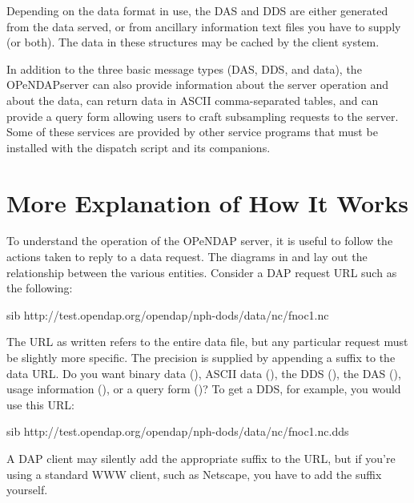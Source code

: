 \documentclass{dods-book}
\begin{document}
Depending on the data format in use, the DAS and DDS are either
generated from the data served, or from ancillary information
 text files you have to
supply (or both). The data in these structures may be cached by the
client system.

In addition to the three basic message types (DAS, DDS, and data), the
OPeNDAPserver can also provide information about the server operation
and about the data, can return data in ASCII comma-separated tables,
and can provide a query form allowing users to craft subsampling
requests to the server. Some of these services are provided by other
service programs that must be installed with the dispatch script and
its companions.

%

\T\pagebreak

\section{More Explanation of How It Works}

To understand the operation of the OPeNDAP server, it is useful to
follow the actions taken to reply to a data request. The diagrams in
 and
 lay out the relationship
between the various entities. Consider a DAP request URL such as the
following:

\begin{vcode}{sib}
http://test.opendap.org/opendap/nph-dods/data/nc/fnoc1.nc
\end{vcode}

  The URL as written
refers to the entire data file, but any particular request must be
slightly more specific.  The precision is supplied by appending a
suffix to the data URL.  Do you want binary data (), ASCII
data (), the DDS (), the DAS (), usage
information (), or a query form ()?  To get a
DDS, for example, you would use this URL:

\begin{vcode}{sib}
http://test.opendap.org/opendap/nph-dods/data/nc/fnoc1.nc.dds
\end{vcode}

A DAP client may silently add the appropriate suffix to the URL, but
if you're using a standard WWW client, such as Netscape, you have to
add the suffix yourself.
\end{document}
